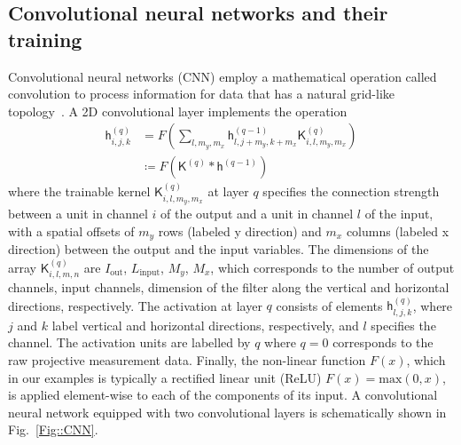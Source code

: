 \documentclass[twocolumn,english,reprint,superscriptaddress,longbibliography,pra]{revtex4-1}
\begin{document}
\subsection{Convolutional neural networks and their training}
Convolutional neural networks (CNN) employ a mathematical operation called convolution to process information for data that has a natural grid-like topology~\cite{Goodfellow-et-al-2016}. A 2D convolutional layer implements the operation
\begin{align*}
\mathsf{h}^{(q)}_{i,j,k}  & =  F\left(\sum_{l,m_y,m_x} \mathsf{h}^{(q-1)}_{l,j+m_y,k+m_x} \mathsf{K}^{(q)}_{i,l,m_y,m_x} \right)  \\
&\coloneqq   F\left( \mathsf{K}^{(q)} *\mathsf{h}^{(q-1)}  \right) \nonumber %
\end{align*}
where the trainable kernel $\mathsf{K}^{(q)}_{i,l,m_y,m_x}$ at layer $q$  specifies the connection strength between a unit in channel $i$ of the output and a unit in channel $l$ of the input, with a spatial offsets of $m_y$ rows (labeled y direction) and $m_x$ columns (labeled x direction) between the output and the input variables. The dimensions of the array $\mathsf{K}^{(q)}_{i,l,m,n}$ are $I_{\text{out}}$, $L_{\text{input}}$, $M_{y}$, $M_{x}$, which corresponds to the number of output channels, input channels, dimension of the filter along the vertical and horizontal directions, respectively. The activation at layer $q$ consists of  elements $\mathsf{h}^{(q)}_{l,j,k}$, where $j$ and $k$ label vertical and horizontal directions, respectively, and $l$ specifies the channel. The activation units are labelled by $q$ where $q=0$ corresponds to the raw projective measurement data. Finally, the non-linear function $F(x)$, which in our examples is typically a rectified linear unit (ReLU) $F(x)=\text{max}(0,x)$, is applied element-wise to each of the components of its input. A convolutional neural network equipped with two convolutional layers is schematically shown in Fig.~\ref{Fig::CNN}.
\end{document}
